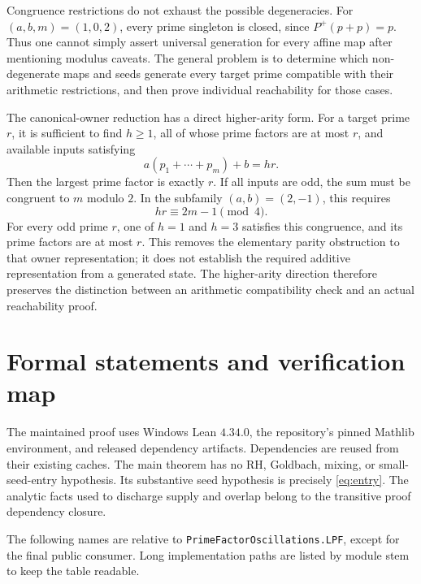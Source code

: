 \documentclass[11pt]{article}
\theoremstyle{definition}
\theoremstyle{remark}
\newcommand{\lean}[1]{\nolinkurl{#1}}
\begin{document}
Congruence restrictions do not exhaust the possible degeneracies.
For \((a,b,m)=(1,0,2)\), every prime singleton is closed, since
\(P^{+}(p+p)=p\). Thus one cannot simply assert universal generation
for every affine map after mentioning modulus caveats.
The general problem is to determine which non-degenerate maps and seeds
generate every target prime compatible with their arithmetic restrictions,
and then prove individual reachability for those cases.

The canonical-owner reduction has a direct higher-arity form. For a
target prime \(r\), it is sufficient to find \(h\ge1\), all of whose prime
factors are at most \(r\), and available inputs satisfying
\[
 a(p_1+\cdots+p_m)+b=hr.
\]
Then the largest prime factor is exactly \(r\). If all inputs are odd,
the sum must be congruent to \(m\) modulo \(2\). In the subfamily
\((a,b)=(2,-1)\), this requires
\[
 hr\equiv2m-1\pmod4.
\]
For every odd prime \(r\), one of \(h=1\) and \(h=3\) satisfies this
congruence, and its prime factors are at most \(r\). This removes the
elementary parity obstruction to that owner representation; it does
not establish the required additive representation from a generated
state. The higher-arity direction therefore preserves the distinction
between an arithmetic compatibility check and an actual reachability proof.

\appendix
\section{Formal statements and verification map}\label{app:formal}

The maintained proof uses Windows Lean \(4.34.0\), the repository's
pinned Mathlib environment, and released dependency artifacts.
Dependencies are reused from their existing caches. The main theorem
has no RH, Goldbach, mixing, or small-seed-entry hypothesis.
Its substantive seed hypothesis is precisely \eqref{eq:entry}.
The analytic facts used to discharge supply and overlap belong to the
transitive proof dependency closure.

The following names are relative to
\lean{PrimeFactorOscillations.LPF}, except for the final public consumer.
Long implementation paths are listed by module stem to keep the table readable.
\end{document}
